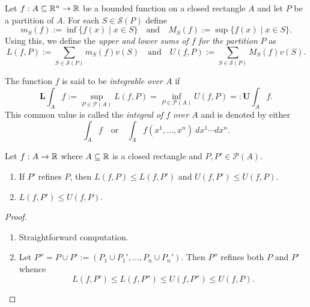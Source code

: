 \begin{definition}[Integral]
    Let $f: A\subseteq\mathbb{R}^n\to\mathbb{R}$ be a bounded function on a closed rectangle $A$ and let $P$ be a partition of $A$. For each $S\in\mathscr S(P)$ define 
    \begin{equation*}
        m_S(f) := \inf\{f(x)\mid x\in S\}\quad\text{and}\quad M_S(f) := \sup\{f(x)\mid x\in S\}.
    \end{equation*}
    Using this, we define the \emph{upper and lower sums of $f$ for the partition $P$} as 
    \begin{equation*}
        L(f,P) := \sum_{S\in\mathscr S(P)}m_S(f)v(S)\quad\text{and}\quad U(f,P) := \sum_{S\in\mathscr S(P)}M_S(f)v(S).
    \end{equation*}

    The function $f$ is said to be \emph{integrable over $A$} if 
    \begin{equation*}
        \mathbf L\int_A f := \sup_{P\in\mathscr P(A)} L(f,P) = \inf_{P\in\mathscr P(A)} U(f,P) =: \mathbf U\int_A f.
    \end{equation*}
    This common value is called the \emph{integral of $f$ over $A$} and is denoted by either 
    \begin{equation*}
        \int_A f \quad\text{or}\quad\int_A f(x^1,\dots,x^n)~dx^1\cdots dx^n.
    \end{equation*}
\end{definition}

\begin{lemma}
    Let $f: A\to\mathbb{R}$ where $A\subseteq\mathbb{R}$ is a closed rectangle and $P, P'\in\mathscr P(A)$. 
    \begin{enumerate}[label=(\alph*)]
        \item If $P'$ refines $P$, then $L(f,P)\le L(f,P')$ and $U(f,P')\le U(f,P)$.
        \item $L(f,P')\le U(f,P)$.
    \end{enumerate}
\end{lemma}
\begin{proof}
\begin{enumerate}[label=(\alph*)]
    \item Straightforward computation.
    \item Let $P'' = P\cup P' := (P_1\cup P_1',\dots,P_n\cup P_n')$. Then $P''$ refines both $P$ and $P'$ whence 
    \begin{equation*}
        L(f,P')\le L(f,P'')\le U(f,P'')\le U(f,P).
    \end{equation*}
\end{enumerate}
\end{proof}

